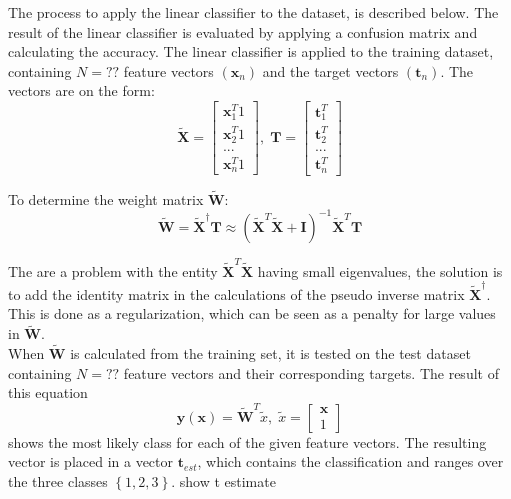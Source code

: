 The process to apply the linear classifier to the dataset, is described below. 
The result of the linear classifier is evaluated by applying a confusion matrix and calculating the accuracy. 
The linear classifier is applied to the training dataset, containing $N =??$ feature vectors $(\mathbf{x}_n)$ and the target vectors $(\mathbf{t}_n)$.
The vectors are on the form:
\begin{equation}
\mathbf{\tilde{X}}=\left[ \begin{array}{c}\mathbf{x}_1^T 1\\
\mathbf{x}_2^T 1\\
...\\ 
\mathbf{x}_n^T 1 \end{array} \right],
\;
\mathbf{T}=\left[ \begin{array}{c}
\mathbf{t}_1^T\\ 
\mathbf{t}_2^T\\ 
...\\
\mathbf{t}_n^T
\end{array} \right]
\label{eq:linearVectors}  
\end{equation} 

To determine the weight matrix $\tilde{\mathbf{W}}$:
\begin{equation}
\tilde{\mathbf{W}} = \tilde{\mathbf{X}}^\dagger \mathbf{T} \approx  (\tilde{\mathbf{X}}^T \tilde{\mathbf{X}}+\mathbf{I})^{-1} \tilde{\mathbf{X}}^T\mathbf{T}
\label{eq:weightVector}  
\end{equation}

The are a problem with the entity $\tilde{\mathbf{X}}^T \tilde{\mathbf{X}}$ having small eigenvalues, the solution is to add the identity matrix in the calculations of the pseudo inverse matrix $\tilde{\mathbf{X}}^\dagger$.
This is done as a regularization, which can be seen as a penalty for large values in $\tilde{\mathbf{W}}$.\\

When $\tilde{\mathbf{W}}$ is calculated from the training set, it is tested on the test dataset containing $N = ??$ feature vectors and their corresponding targets. 
The result of this equation
\begin{equation}
\mathbf{y}(\mathbf{x}) = \tilde{\mathbf{W}}^{T} \tilde{x},
\;
\tilde{x} = \left[\begin{array}{c}
\mathbf{x}\\ 1
\end{array} \right] 
\label{eq:Yclassifier}
\end{equation}
shows the most likely class for each of the given feature vectors. 
The resulting vector is placed in a vector $\mathbf{t}_{est}$, which contains the classification and ranges over the three classes $\left\lbrace 1,2,3\right\rbrace $. show t estimate %

